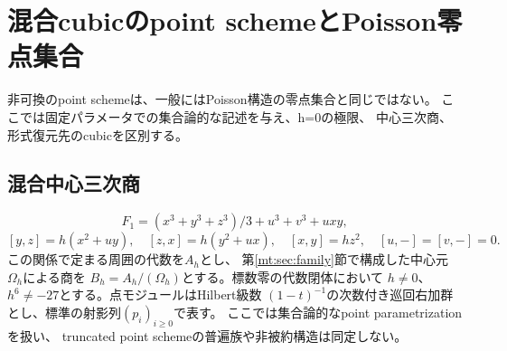 \section{混合cubicのpoint schemeとPoisson零点集合}
\label{sec:points-poisson-cubic}

非可換のpoint schemeは、一般にはPoisson構造の零点集合と同じではない。
ここでは固定パラメータでの集合論的な記述を与え、h=0の極限、
中心三次商、形式復元先のcubicを区別する。

\subsection{混合中心三次商}
\[
F_1=(x^3+y^3+z^3)/3+u^3+v^3+uxy,
\]
\[
[y,z]=h(x^2+uy),\quad[z,x]=h(y^2+ux),\quad[x,y]=hz^2,
\quad[u,-]=[v,-]=0.
\]
この関係で定まる周囲の代数を$A_h$とし、
第\ref{mt:sec:family}節で構成した中心元$\Omega_h$による商を
$B_h=A_h/(\Omega_h)$とする。標数零の代数閉体において
$h\ne0$、$h^6\ne-27$とする。点モジュールはHilbert級数
$(1-t)^{-1}$の次数付き巡回右加群とし、標準の射影列$(p_i)_{i\ge0}$で表す。
ここでは集合論的なpoint parametrizationを扱い、
truncated point schemeの普遍族や非被約構造は同定しない。

